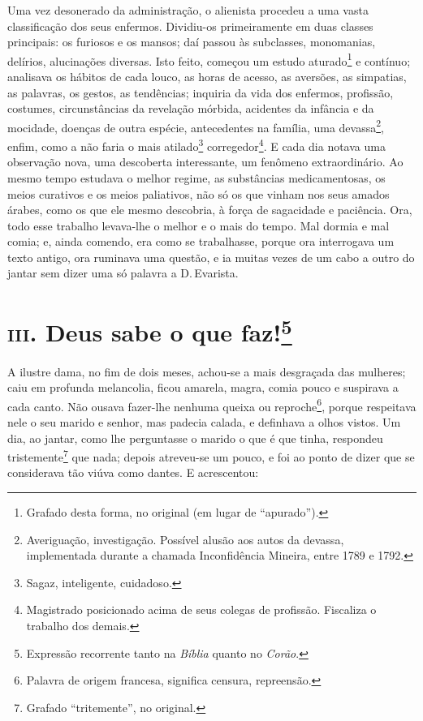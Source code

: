 Uma vez desonerado da administração, o alienista procedeu a uma vasta
classificação dos seus enfermos. Dividiu-os primeiramente em duas
classes principais: os furiosos e os mansos; daí passou às subclasses,
monomanias, delírios, alucinações diversas. Isto feito, começou um
estudo aturado\footnote{Grafado desta forma, no original (em lugar de
  ``apurado'').} e contínuo; analisava os hábitos de cada louco, as
horas de acesso, as aversões, as simpatias, as palavras, os gestos, as
tendências; inquiria da vida dos enfermos, profissão, costumes,
circunstâncias da revelação mórbida, acidentes da infância e da
mocidade, doenças de outra espécie, antecedentes na família, uma
devassa\footnote{Averiguação, investigação. Possível alusão aos autos da
  devassa, implementada durante a chamada Inconfidência Mineira, entre
  1789 e 1792.}, enfim, como a não faria o mais atilado\footnote{Sagaz,
  inteligente, cuidadoso.} corregedor\footnote{Magistrado posicionado
  acima de seus colegas de profissão. Fiscaliza o trabalho dos demais.}.
E cada dia notava uma observação nova, uma descoberta interessante, um
fenômeno extraordinário. Ao mesmo tempo estudava o melhor regime, as
substâncias medicamentosas, os meios curativos e os meios paliativos,
não só os que vinham nos seus amados árabes, como os que ele mesmo
descobria, à força de sagacidade e paciência. Ora, todo esse trabalho
levava-lhe o melhor e o mais do tempo. Mal dormia e mal comia; e, ainda
comendo, era como se trabalhasse, porque ora interrogava um texto
antigo, ora ruminava uma questão, e ia muitas vezes de um cabo a outro
do jantar sem dizer uma só palavra a D.\,Evarista.

\section*{\textsc{iii}. Deus sabe o que faz!\protect\footnote[*]{\MakeUppercase{E}xpressão recorrente tanto na \emph{\MakeUppercase{B}íblia} quanto no \emph{\MakeUppercase{C}orão}.}}

A ilustre dama, no fim de dois meses, achou-se a mais desgraçada das
mulheres; caiu em profunda melancolia, ficou amarela, magra, comia pouco
e suspirava a cada canto. Não ousava fazer-lhe nenhuma queixa ou
reproche\footnote{Palavra de origem francesa, significa censura,
  repreensão.}, porque respeitava nele o seu marido e senhor, mas
padecia calada, e definhava a olhos vistos. Um dia, ao jantar, como lhe
perguntasse o marido o que é que tinha, respondeu tristemente\footnote{Grafado
  ``tritemente'', no original.} que nada; depois atreveu-se um pouco, e
foi ao ponto de dizer que se considerava tão viúva como dantes. E
acrescentou:

